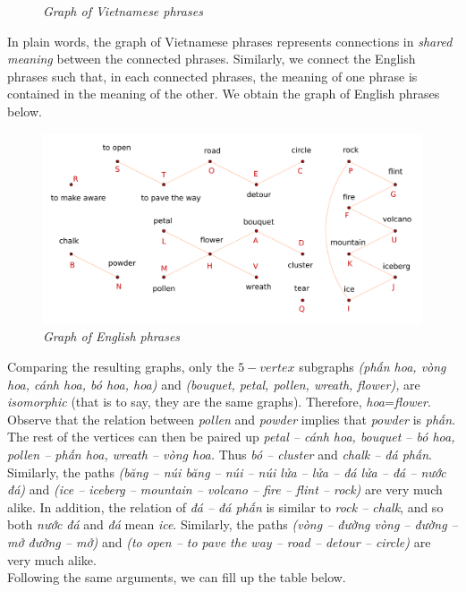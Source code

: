 \begin{multicols}{2}
\begin{figure}[H]
	\caption{\small\textit{\color{toancuabi}Graph of Vietnamese phrases}}
	\vspace*{-10pt}
\end{figure}
In plain words, the graph of Vietnamese phrases represents connections in \textit{shared meaning} between the connected phrases.
Similarly, we connect the English phrases such that, in each connected phrases, the meaning of one phrase is contained in the meaning of the other.
We obtain the graph of English phrases below.
\begin{figure}[H]
	\vspace*{-5pt}
	\centering
	\captionsetup{labelformat= empty, justification=centering}
	\includegraphics[width= 1\linewidth]{hc-2022-2-2-2-2.pdf}
	\caption{\small\textit{\color{toancuabi}Graph of English phrases}}
	\vspace*{-10pt}
\end{figure}  
Comparing the resulting graphs, only the $5-vertex$ subgraphs \textit{(phấn hoa, vòng hoa, cánh hoa, bó hoa, hoa)} and
\textit{(bouquet, petal, pollen, wreath, flower),} are \textit{isomorphic} (that is to say, they are the same graphs). Therefore, \textit{hoa}=\textit{flower}.
Observe that the relation between \textit{pollen} and \textit{powder} implies that \textit{powder} is \textit{phấn}. The rest of the vertices can then be paired up
\textit{petal -- cánh hoa, bouquet -- bó hoa, pollen -- phấn hoa, wreath -- vòng hoa.}
Thus \textit{bó -- cluster} and \textit{chalk -- đá phấn}.
Similarly, the paths \textit{(băng -- núi băng -- núi -- núi lửa -- lửa -- đá lửa -- đá -- nước đá)} and
\textit{(ice -- iceberg -- mountain -- volcano -- fire -- flint -- rock)} are very much alike. In addition, the relation of \textit{đá -- đá phấn} is similar to \textit{rock -- chalk}, and so both \textit{nước đá} and \textit{đá} mean \textit{ice}.
Similarly, the paths \textit{(vòng -- đường vòng -- đường -- mở đường -- mở)} and
\textit{(to open -- to pave the way -- road -- detour -- circle)} are very much alike.\\
Following the same arguments, we can fill up the table below.
\end{multicols}
